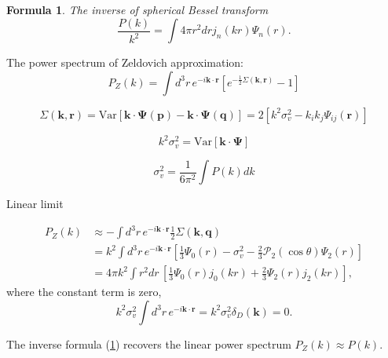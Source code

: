 \documentclass[a4paper,11pt]{article}
\newtheorem{formula}{Formula}[section]
\begin{document}
\begin{formula}
  \label{formula:inverse-bessel}
  The inverse of spherical Bessel transform
  \begin{equation}
    \frac{P(k)}{k^2} = \int 4\pi r^2 dr j_n(kr) \Psi_n(r).
  \end{equation}
\end{formula}

The power spectrum of Zeldovich approximation:
\begin{equation}
  P_Z(k) = \int \! d^3 r \, e^{-i\bm{k}\cdot\bm{r}}
                          \left[ e^{-\frac{1}{2} \Sigma(\bm{k}, \bm{r})} - 1 \right]
\end{equation}

\begin{equation}
  \Sigma(\bm{k}, \bm{r}) = \mathrm{Var} \left[
   \bm{k} \cdot \bm{\Psi}(\bm{p}) - \bm{k} \cdot \bm{\Psi}(\bm{q}) \right]
    = 2\left[ k^2 \sigma_v^2 - k_i k_j \Psi_{ij}(\bm{r}) \right]
\end{equation}

\begin{equation}
  k^2 \sigma_v^2 = \textrm{Var}\left[ \bm{k}\cdot\bm{\Psi} \right]
\end{equation}

\begin{equation}
  \sigma_v^2 = \frac{1}{6\pi^2}\int \! P(k) dk
\end{equation}

Linear limit

\begin{align}
  P_Z(k) &\approx - \int \! d^3 r \, e^{-i\bm{k}\cdot\bm{r}}
           \frac{1}{2}\Sigma(\bm{k}, \bm{q})\\
           &= k^2 \int\!d^3 r \, e^{-i\bm{k}\cdot\bm{r}}
               \left[ \frac{1}{3} \Psi_0(r) - \sigma_v^2
                 - \frac{2}{3} \mathcal{P}_2(\cos\theta) \Psi_2(r) \right]\\
               &= 4\pi k^2 \int\! r^2 d r \,
               \left[ \frac{1}{3} \Psi_0(r) j_0(kr)
                      + \frac{2}{3} \Psi_2(r) j_2(kr) \right],
\end{align}
where the constant term is zero,
\begin{equation}
  k^2 \sigma_v^2 \int \! d^3 r \, e^{-i\bm{k}\cdot\bm{r}} 
  =  k^2 \sigma_v^2 \delta_D(\bm{k}) = 0.
\end{equation}

The inverse formula (\ref{formula:inverse-bessel}) recovers the linear
power spectrum $P_Z(k) \approx P(k)$.

  

\label{LastPage}
\end{document}
